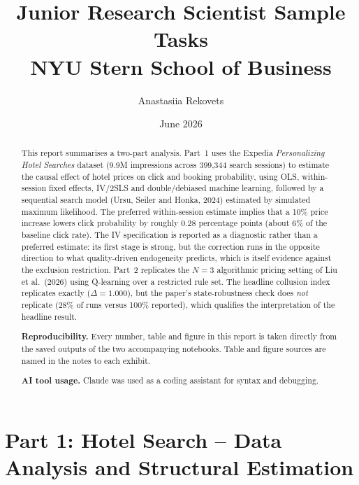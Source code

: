 \documentclass[11pt]{article}
\title{\vspace{-2em}\textbf{Junior Research Scientist Sample Tasks}\\[0.4em]
       \large NYU Stern School of Business}
\author{Anastasiia Rekovets}
\date{June 2026}
\begin{document}
\maketitle
\thispagestyle{empty}

\begin{abstract}
\noindent
This report summarises a two-part analysis. Part~1 uses the Expedia
\emph{Personalizing Hotel Searches} dataset (9.9M impressions across 399,344
search sessions) to estimate the causal effect of hotel prices on click and
booking probability, using OLS, within-session fixed effects, IV/2SLS and
double/debiased machine learning, followed by a sequential search model
(Ursu, Seiler and Honka, 2024) estimated by simulated maximum likelihood.
The preferred within-session estimate implies that a 10\% price increase
lowers click probability by roughly 0.28 percentage points (about 6\% of the
baseline click rate). The IV specification is reported as a diagnostic rather
than a preferred estimate: its first stage is strong, but the correction runs
in the opposite direction to what quality-driven endogeneity predicts, which
is itself evidence against the exclusion restriction. Part~2 replicates the
$N=3$ algorithmic pricing setting of Liu et al.\ (2026) using Q-learning over
a restricted rule set. The headline collusion index replicates exactly
($\Delta = 1.000$), but the paper's state-robustness check does \emph{not}
replicate (28\% of runs versus 100\% reported), which qualifies the
interpretation of the headline result.

\vspace{1em}
\noindent\textbf{Reproducibility.} Every number, table and figure in this
report is taken directly from the saved outputs of the two accompanying
notebooks. Table and figure sources are named in the notes to each exhibit.

\vspace{0.5em}
\noindent\textbf{AI tool usage.} Claude was used as a coding assistant for
syntax and debugging.
\end{abstract}

\clearpage
\tableofcontents
\clearpage

\section{Part 1: Hotel Search -- Data Analysis and Structural Estimation}
\end{document}
